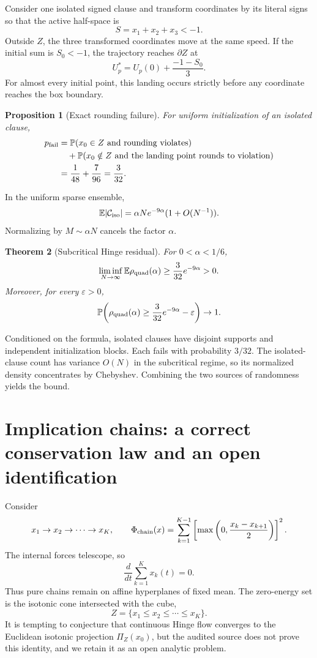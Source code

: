 \documentclass[11pt,a4paper]{article}
\newtheorem{theorem}{Theorem}[section]
\newtheorem{proposition}[theorem]{Proposition}
\begin{document}
Consider one isolated signed clause and transform coordinates by its literal signs so that the active half-space is
\[
S=x_1+x_2+x_3<-1.
\]
Outside $Z$, the three transformed coordinates move at the same speed. If the initial sum is $S_0<-1$, the trajectory reaches $\partial Z$ at
\begin{equation}
U_p^*=U_p(0)+\frac{-1-S_0}{3}.
\end{equation}
For almost every initial point, this landing occurs strictly before any coordinate reaches the box boundary.

\begin{proposition}[Exact rounding failure]
For uniform initialization of an isolated clause,
\begin{align}
p_{\rm fail}&=\mathbb P(x_0\in Z\ \text{and rounding violates})\\
&\quad+\mathbb P(x_0\notin Z\ \text{and the landing point rounds to violation})\\
&=\frac1{48}+\frac7{96}=\frac3{32}.
\end{align}
\end{proposition}

In the uniform sparse ensemble,
\[
\mathbb E|\mathcal C_{\rm iso}|=\alpha Ne^{-9\alpha}(1+O(N^{-1})).
\]
Normalizing by $M\sim\alpha N$ cancels the factor $\alpha$.

\begin{theorem}[Subcritical Hinge residual]
For $0<\alpha<1/6$,
\[
\liminf_{N\to\infty}\mathbb E\rho_{\rm quad}(\alpha)\ge\frac3{32}e^{-9\alpha}>0.
\]
Moreover, for every $\varepsilon>0$,
\[
\mathbb P\!\left(\rho_{\rm quad}(\alpha)\ge\frac3{32}e^{-9\alpha}-\varepsilon\right)\to1.
\]
\end{theorem}

Conditioned on the formula, isolated clauses have disjoint supports and independent initialization blocks. Each fails with probability $3/32$. The isolated-clause count has variance $O(N)$ in the subcritical regime, so its normalized density concentrates by Chebyshev. Combining the two sources of randomness yields the bound.

\section{Implication chains: a correct conservation law and an open identification}
Consider
\[
x_1\to x_2\to\cdots\to x_K,
\qquad
\Phi_{\rm chain}(x)=\sum_{k=1}^{K-1}\left[\max\left(0,\frac{x_k-x_{k+1}}2\right)\right]^2.
\]
The internal forces telescope, so
\begin{equation}
\frac{d}{dt}\sum_{k=1}^Kx_k(t)=0.
\end{equation}
Thus pure chains remain on affine hyperplanes of fixed mean. The zero-energy set is the isotonic cone intersected with the cube,
\[
Z=\{x_1\le x_2\le\cdots\le x_K\}.
\]
It is tempting to conjecture that continuous Hinge flow converges to the Euclidean isotonic projection $\Pi_Z(x_0)$, but the audited source does not prove this identity, and we retain it as an open analytic problem.
\end{document}
